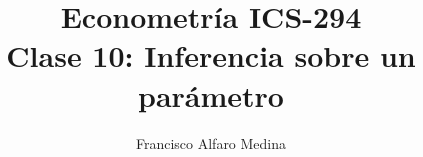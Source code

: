 \documentclass{beamer}
\title[ICS-162]{Econometría ICS-294\\ \small{Clase 10: Inferencia sobre un parámetro}}
\author{Francisco Alfaro Medina}
\institute[USM]
{Universidad Técnica Federico Santa María\\ %
	\medskip
	\textit{} %
	
}
\date{}
\begin{document}
	
\begin{frame}
	\titlepage %


\end{frame}
\logo{}


\end{document}
